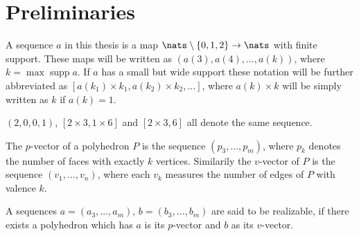 \section{Preliminaries}

\begin{definition}[Sequence]
  A sequence $a$ in this thesis is a map $\nats \setminus \{0, 1, 2\} \rightarrow \nats$ with finite support. These maps will be written as $(a(3), a(4), ..., a(k))$, where $k = \operatorname{max} \operatorname{supp} a$. If $a$ has a small but wide support these notation will be further abbreviated as $[a(k_1) \times k_1, a(k_2) \times k_2, ...]$, where $a(k) \times k$ will be simply written as $k$ if $a(k) = 1$.
\end{definition}
\begin{example}
  $(2, 0, 0, 1)$, $[2 \times 3, 1 \times 6]$ and $[2 \times 3, 6]$ all denote the same sequence. 
\end{example}
\begin{definition}\label{def_relizable}
  The $p$-vector of a polyhedron $P$ is the sequence $(p_3, \dots, p_m)$, where $p_k$ denotes the number of faces with exactly $k$ vertices. Similarily the $v$-vector of $P$ is the sequence $(v_1, \dots, v_n)$, where each $v_k$ measures the number of edges of $P$ with valence $k$. 
\end{definition}

\begin{definition}
A sequences $a = (a_3, \dots, a_m)$, $b = (b_3, \dots, b_m)$ are said to be realizable, if there exists a polyhedron which has $a$ is its $p$-vector and $b$ as its $v$-vector.
\end{definition}

